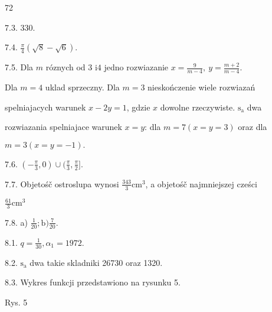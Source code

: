 \documentclass[a4paper,12pt]{article}
\begin{document}
72

7.3. 330.

7.4. $\displaystyle \frac{\pi}{4}(\sqrt{8}-\sqrt{6}).$

7.5. Dla $m$ róznych od 3 $\mathrm{i}4$ jedno rozwiazanie $x=\displaystyle \frac{9}{m-4},\ y=\displaystyle \frac{m+2}{m-4}$.

Dla $m = 4$ uklad sprzeczny. Dla $m = 3$ nieskończenie wiele rozwiazań

spelniajacych warunek $x-2y = 1$, gdzie $x$ dowolne rzeczywiste. $\mathrm{s}_{\mathrm{a}}$ dwa

rozwiazania spelniajace warunek $x=y$: dla $m=7 (x=y=3)$ oraz dla

$m=3 (x=y=-1).$

7.6. $(-\displaystyle \frac{\pi}{3},0)\cup(\frac{\pi}{3},\frac{\pi}{2}].$

7.7. Objetośč ostroslupa wynosi $\displaystyle \frac{343}{3}\mathrm{c}\mathrm{m}^{3}$, a objetośč najmniejszej cześci

$\displaystyle \frac{61}{3}\mathrm{c}\mathrm{m}^{3}$

7.8. a) $\displaystyle \frac{1}{20};\mathrm{b}) \displaystyle \frac{7}{20}.$

8.1. $q=\displaystyle \frac{1}{30}, \alpha_{1}=1972.$

8.2. $\mathrm{s}_{\mathrm{a}}$ dwa takie skladniki 26730 oraz 1320.

8.3. Wykres funkcji przedstawiono na rysunku 5.

Rys. 5
\end{document}
